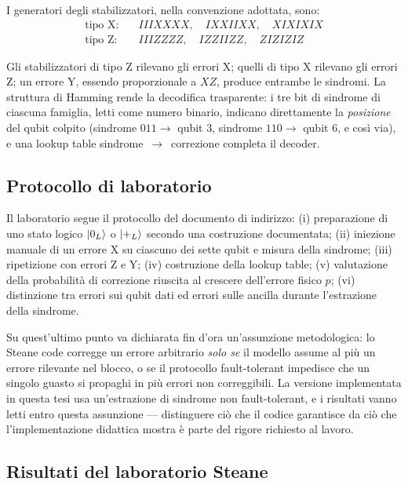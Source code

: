 \begin{onehalfspace}
I generatori degli stabilizzatori, nella convenzione adottata, sono:
\begin{equation}
\begin{aligned}
\text{tipo X:} \quad & IIIXXXX, \quad IXXIIXX, \quad XIXIXIX \\
\text{tipo Z:} \quad & IIIZZZZ, \quad IZZIIZZ, \quad ZIZIZIZ
\end{aligned}
\label{eq:steane_stabilizzatori}
\end{equation}

Gli stabilizzatori di tipo Z rilevano gli errori X; quelli di tipo X rilevano gli errori Z; un errore Y, essendo proporzionale a $XZ$, produce entrambe le sindromi. La struttura di Hamming rende la decodifica trasparente: i tre bit di sindrome di ciascuna famiglia, letti come numero binario, indicano direttamente la \emph{posizione} del qubit colpito (sindrome $011 \rightarrow$ qubit 3, sindrome $110 \rightarrow$ qubit 6, e così via), e una lookup table sindrome~$\rightarrow$~correzione completa il decoder.

\subsection{Protocollo di laboratorio}

Il laboratorio segue il protocollo del documento di indirizzo: (i) preparazione di uno stato logico $\ket{0_L}$ o $\ket{+_L}$ secondo una costruzione documentata; (ii) iniezione manuale di un errore X su ciascuno dei sette qubit e misura della sindrome; (iii) ripetizione con errori Z e Y; (iv) costruzione della lookup table; (v) valutazione della probabilità di correzione riuscita al crescere dell'errore fisico $p$; (vi) distinzione tra errori sui qubit dati ed errori sulle ancilla durante l'estrazione della sindrome.

Su quest'ultimo punto va dichiarata fin d'ora un'assunzione metodologica: lo Steane code corregge un errore arbitrario \emph{solo se} il modello assume al più un errore rilevante nel blocco, o se il protocollo fault-tolerant impedisce che un singolo guasto si propaghi in più errori non correggibili. La versione implementata in questa tesi usa un'estrazione di sindrome non fault-tolerant, e i risultati vanno letti entro questa assunzione --- distinguere ciò che il codice garantisce da ciò che l'implementazione didattica mostra è parte del rigore richiesto al lavoro.

\subsection{Risultati del laboratorio Steane}
\label{subsec:risultati_steane}


\end{onehalfspace}
